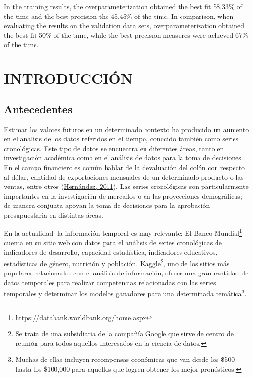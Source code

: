 \documentclass[
]{article}
\begin{document}
In the training results, the overparameterization obtained the best fit
58.33\% of the time and the best precision the 45.45\% of the time. In
comparison, when evaluating the results on the validation data sets,
overparameterization obtained the best fit 50\% of the time, while the
best precision measures were achieved 67\% of the time.

\cleardoublepage

\listoftables

\listoffigures

\cleardoublepage
{}

\newpage

\section{INTRODUCCIÓN}

\subsection{Antecedentes}

Estimar los valores futuros en un determinado contexto ha producido un
aumento en el análisis de los datos referidos en el tiempo, conocido
también como series cronológicas. Este tipo de datos se encuentra en
diferentes áreas, tanto en investigación académica como en el análisis
de datos para la toma de decisiones. En el campo financiero es común
hablar de la devaluación del colón con respecto al dólar, cantidad de
exportaciones mensuales de un determinado producto o las ventas, entre
otros (\protect\hyperlink{ref-oscarh-1}{Hernández, 2011}). Las series
cronológicas son particularmente importantes en la investigación de
mercados o en las proyecciones demográficas; de manera conjunta apoyan
la toma de decisiones para la aprobación presupuestaria en distintas
áreas.

En la actualidad, la información temporal es muy relevante: El Banco
Mundial\footnote{\url{https://databank.worldbank.org/home.aspx}} cuenta
en su sitio web con datos para el análisis de series cronológicas de
indicadores de desarrollo, capacidad estadística, indicadores
educativos, estadísticas de género, nutrición y población.
Kaggle\footnote{Se trata de una subsidiaria de la compañía Google que
  sirve de centro de reunión para todos aquellos interesados en la
  ciencia de datos.}, uno de los sitios más populares relacionados con
el análisis de información, ofrece una gran cantidad de datos temporales
para realizar competencias relacionadas con las series temporales y
determinar los modelos ganadores para una determinada
temática\footnote{Muchas de ellas incluyen recompensas económicas que
  van desde los \$500 hasta los \$100,000 para aquellos que logren
  obtener los mejor pronósticos.}.
\end{document}
